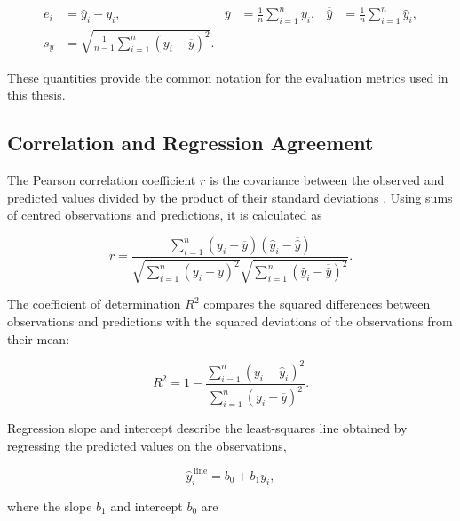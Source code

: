 \begin{equation}
\begin{aligned}
e_i &= \widehat{y}_i-y_i,
&
\overline{y} &= \frac{1}{n}\sum_{i=1}^{n}y_i,
&
\overline{\widehat{y}} &= \frac{1}{n}\sum_{i=1}^{n}\widehat{y}_i,\\
s_y &= \sqrt{\frac{1}{n-1}\sum_{i=1}^{n}\left(y_i-\overline{y}\right)^2}.
\end{aligned}
\label{eq:metric_common_notation}
\end{equation}

These quantities provide the common notation for the evaluation metrics used in this thesis.

\subsection{Correlation and Regression Agreement}

The Pearson correlation coefficient \(r\) is the covariance between the observed and predicted values divided by the product of their standard deviations \cite{benesty2009pearson}. Using sums of centred observations and predictions, it is calculated as

\begin{equation}
r=
\frac{\sum_{i=1}^{n}\left(y_i-\overline{y}\right)
\left(\widehat{y}_i-\overline{\widehat{y}}\right)}
{\sqrt{\sum_{i=1}^{n}\left(y_i-\overline{y}\right)^2}
\sqrt{\sum_{i=1}^{n}\left(\widehat{y}_i-\overline{\widehat{y}}\right)^2}}.
\label{eq:pearson_correlation}
\end{equation}

The coefficient of determination \(R^2\) compares the squared differences between observations and predictions with the squared deviations of the observations from their mean:

\begin{equation}
R^2=1-
\frac{\sum_{i=1}^{n}\left(y_i-\widehat{y}_i\right)^2}
{\sum_{i=1}^{n}\left(y_i-\overline{y}\right)^2}.
\label{eq:coefficient_determination}
\end{equation}

Regression slope and intercept describe the least-squares line obtained by regressing the predicted values on the observations,

\begin{equation}
\widehat{y}^{\,\mathrm{line}}_i=b_0+b_1y_i,
\label{eq:prediction_regression_line}
\end{equation}

where the slope \(b_1\) and intercept \(b_0\) are

